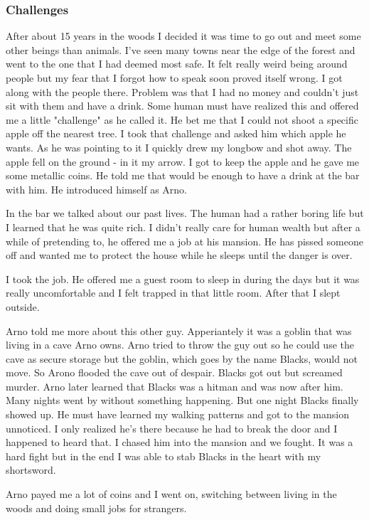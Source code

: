 \documentclass[letterpaper,10pt,twoside,twocolumn,openany]{book}
\begin{document}
	\subsubsection{Challenges}
	After about 15 years in the woods I decided it was time to go out and meet some other beings than animals. I've seen many towns near the edge of the forest and went to the one that I had deemed most safe. It felt really weird being around people but my fear that I forgot how to speak soon proved itself wrong. I got along with the people there. Problem was that I had no money and couldn't just sit with them and have a drink. Some human must have realized this and offered me a little "challenge" as he called it. He bet me that I could not shoot a specific apple off the nearest tree. I took that challenge and asked him which apple he wants. As he was pointing to it I quickly drew my longbow and shot away. The apple fell on the ground - in it my arrow. I got to keep the apple and he gave me some metallic coins. He told me that would be enough to have a drink at the bar with him. He introduced himself as Arno.  
	
	In the bar we talked about our past lives. The human had a rather boring life but I learned that he was quite rich. I didn't really care for human wealth but after a while of pretending to, he offered me a job at his mansion. He has pissed someone off and wanted me to protect the house while he sleeps until the danger is over.
	 
	I took the job. He offered me a guest room to sleep in during the days but it was really uncomfortable and I felt trapped in that little room. After that I slept outside. 
	
	Arno told me more about this other guy. Apperiantely it was a goblin that was living in a cave Arno owns. Arno tried to throw the guy out so he could use the cave as secure storage but the goblin, which goes by the name Blacks, would not move. So Arono flooded the cave out of despair. Blacks got out but screamed murder. Arno later learned that Blacks was a hitman and was now after him. 
	Many nights went by without something happening. But one night Blacks finally showed up. He must have learned my walking patterns and got to the mansion unnoticed. I only realized he's there because he had to break the door and I happened to heard that. I chased him into the mansion and we fought. It was a hard fight but in the end I was able to stab Blacks in the heart with my shortsword. 
	
	Arno payed me a lot of coins and I went on, switching between living in the woods and doing small jobs for strangers. 
	
\end{document}
